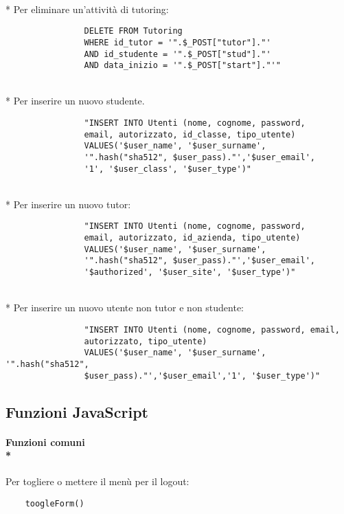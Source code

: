 \documentclass[12pt]{article}
\begin{document}
\\*
\noindent
Per eliminare un'attività di tutoring:
\begin{verbatim}
                DELETE FROM Tutoring 
                WHERE id_tutor = '".$_POST["tutor"]."'
                AND id_studente = '".$_POST["stud"]."'
                AND data_inizio = '".$_POST["start"]."'"
\end{verbatim}

\\*
\noindent
Per inserire un nuovo studente.
\begin{verbatim}
                "INSERT INTO Utenti (nome, cognome, password,
                email, autorizzato, id_classe, tipo_utente)
                VALUES('$user_name', '$user_surname',
                '".hash("sha512", $user_pass)."','$user_email',
                '1', '$user_class', '$user_type')"
\end{verbatim}

\\*
\noindent
Per inserire un nuovo tutor:
\begin{verbatim}
                "INSERT INTO Utenti (nome, cognome, password,
                email, autorizzato, id_azienda, tipo_utente)
                VALUES('$user_name', '$user_surname', 
                '".hash("sha512", $user_pass)."','$user_email',
                '$authorized', '$user_site', '$user_type')"
\end{verbatim}  

\\*
\noindent
Per inserire un nuovo utente non tutor e non studente:
\begin{verbatim}
                "INSERT INTO Utenti (nome, cognome, password, email, 
                autorizzato, tipo_utente)
                VALUES('$user_name', '$user_surname', '".hash("sha512",
                $user_pass)."','$user_email','1', '$user_type')"
\end{verbatim}

\newpage
\subsection{Funzioni JavaScript}
\paragraph{Funzioni comuni\\*}
\noindent
Per togliere o mettere il menù per il logout:
\begin{verbatim}
    toogleForm()
\end{verbatim}
\end{document}
